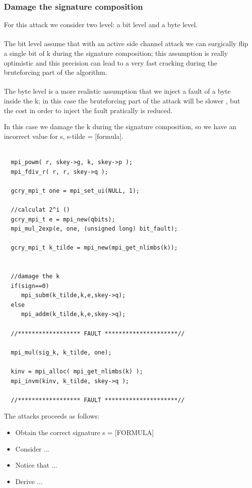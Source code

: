 \documentclass[11pt,english]{article}
\begin{document}
\subsubsection{Damage the signature composition}

For this attack we consider two level: a bit level and a byte level.\\\\ The bit level assume that with an active side channel attack we can surgically flip a single bit of k during the signature composition; this assumption is really optimistic and this precision can lead to a very fast cracking during the bruteforcing part of the algorithm.\\\\ The byte level is a more realistic assumption that we inject a fault of a byte inside the k; in this case the bruteforcing part of the attack will be slower , but the cost in order to inject the fault pratically is reduced.

In this case we damage the k during the signature composition, so we have an incorrect value for s, s-tilde = [formula].

\begin{lstlisting}
   
  mpi_powm( r, skey->g, k, skey->p );
  mpi_fdiv_r( r, r, skey->q );

  gcry_mpi_t one = mpi_set_ui(NULL, 1); 

  //calculat 2^i ()
  gcry_mpi_t e = mpi_new(qbits);
  mpi_mul_2exp(e, one, (unsigned long) bit_fault);  

  gcry_mpi_t k_tilde = mpi_new(mpi_get_nlimbs(k));
  

  //damage the k
  if(sign==0)
     mpi_subm(k_tilde,k,e,skey->q);  
  else
     mpi_addm(k_tilde,k,e,skey->q);

  //****************** FAULT *********************//
  
  mpi_mul(sig_k, k_tilde, one);
  
  kinv = mpi_alloc( mpi_get_nlimbs(k) );
  mpi_invm(kinv, k_tilde, skey->q );
  
  //****************** FAULT *********************//

\end{lstlisting}

The attacks proceeds as follows: 
\begin{itemize}
\item Obtain the correct signature  s = [FORMULA]
\item Consider ...
\item Notice that ...
\item Derive ...
\end{itemize}
\end{document}
